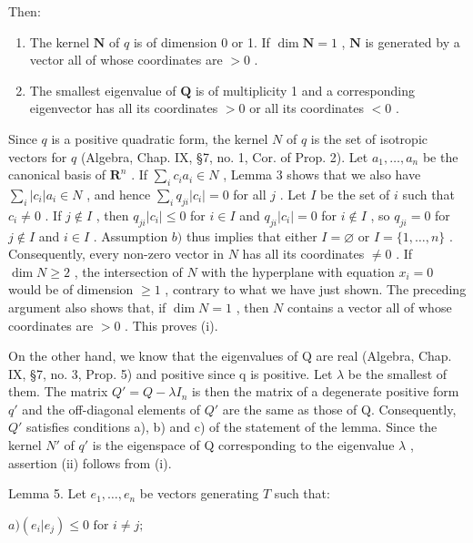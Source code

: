 Then:

\begin{enumerate}
\def\labelenumi{(\roman{enumi})}
\item
  The kernel \(\mathbf{N}\) of \(q\) is of dimension 0 or 1. If \(\dim \mathbf{N} = 1\) , \(\mathbf{N}\) is generated by a vector all of whose coordinates are \(> 0\) .
\item
  The smallest eigenvalue of \(\mathbf{Q}\) is of multiplicity 1 and a corresponding eigenvector has all its coordinates \(>0\) or all its coordinates \(< 0\) .
\end{enumerate}

Since \(q\) is a positive quadratic form, the kernel \(N\) of \(q\) is the set of isotropic vectors for \(q\) (Algebra, Chap. IX, §7, no. 1, Cor. of Prop. 2). Let \(a_1, \ldots, a_n\) be the canonical basis of \(\mathbf{R}^n\) . If \(\sum_{i} c_i a_i \in N\) , Lemma 3 shows that we also have \(\sum_{i} |c_i| a_i \in N\) , and hence \(\sum_{i} q_{ji}|c_i| = 0\) for all \(j\) . Let \(I\) be the set of \(i\) such that \(c_i \neq 0\) . If \(j \notin I\) , then \(q_{ji}|c_i| \leqslant 0\) for \(i \in I\) and \(q_{ji}|c_i| = 0\) for \(i \notin I\) , so \(q_{ji} = 0\) for \(j \notin I\) and \(i \in I\) . Assumption \(b)\) thus implies that either \(I = \varnothing\) or \(I = \{1, \ldots, n\}\) . Consequently, every non-zero vector in \(N\) has all its coordinates \(\neq 0\) . If \(\dim N \geqslant 2\) , the intersection of \(N\) with the hyperplane with equation \(x_i = 0\) would be of dimension \(\geqslant 1\) , contrary to what we have just shown. The preceding argument also shows that, if \(\dim N = 1\) , then \(N\) contains a vector all of whose coordinates are \(>0\) . This proves (i).

On the other hand, we know that the eigenvalues of Q are real (Algebra, Chap. IX, §7, no. 3, Prop. 5) and positive since q is positive. Let \(\lambda\) be the smallest of them. The matrix \(Q' = Q - \lambda I_n\) is then the matrix of a degenerate positive form \(q'\) and the off-diagonal elements of \(Q'\) are the same as those of Q. Consequently, \(Q'\) satisfies conditions a), b) and c) of the statement of the lemma. Since the kernel \(N'\) of \(q'\) is the eigenspace of Q corresponding to the eigenvalue \(\lambda\) , assertion (ii) follows from (i).

Lemma 5. Let \(e_1, \ldots, e_n\) be vectors generating \(T\) such that:

\(a) (e_i | e_j) \leqslant 0 \text{ for } i \neq j;\)

